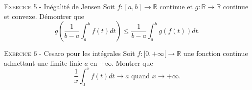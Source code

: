 \documentclass[11pt]{article}
\begin{document}
\vskip0.3cm\noindent\textsc{Exercice 5} - Inégalité de Jensen
\vskip0.2cm
Soit $f:[a,b]\to\mathbb R$ continue et $g:\mathbb R\to\mathbb R$ continue et convexe. Démontrer que 
$$g\left(\frac{1}{b-a}\int_a^b f(t)dt \right)\leq \frac{1}{b-a}\int_a^b g(f(t))dt.$$




\vskip0.3cm\noindent\textsc{Exercice 6} - Cesaro pour les intégrales
\vskip0.2cm
Soit $f:[0,+\infty[\to\mathbb R$ une fonction continue admettant une limite finie $a$ en $+\infty$.
Montrer que
$$\frac 1x\int_0^x f(t)dt\to a\textrm{ quand }x\to+\infty.$$




\vskip0.5cm

\end{document}
